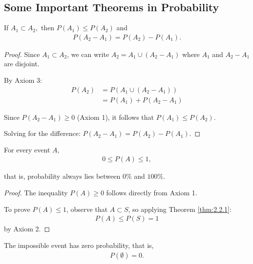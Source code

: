 \subsection{Some Important Theorems in Probability}

\begin{theorem}
	\label{thm:2.2.1}
	If $A_{1}\subset A_{2},$ then $P(A_{1})\leq P(A_{2})$ and
	\begin{align}
		P(A_{2}-A_{1})=P(A_{2})-P(A_{1}).
	\end{align}
\end{theorem}

\begin{proof}
	Since $A_1 \subset A_2$, we can write $A_2 = A_1 \cup (A_2 - A_1)$ where $A_1$ and $A_2 - A_1$ are disjoint.
	
	By Axiom 3:
	\begin{align}
		P(A_2) &= P(A_1 \cup (A_2 - A_1)) \\
		&= P(A_1) + P(A_2 - A_1)
	\end{align}
	
	Since $P(A_2 - A_1) \geq 0$ (Axiom 1), it follows that $P(A_1) \leq P(A_2)$.
	
	Solving for the difference: $P(A_2 - A_1) = P(A_2) - P(A_1)$.
\end{proof}


\begin{theorem}
	\label{thm:2.2.2}
	For every event $A$,
	\begin{align}
		\label{eq:2.2.5}
		0\leq P(A) \leq 1,
	\end{align}
	
	that is, probability always lies between $0\%$ and $100\%.$
\end{theorem}

\begin{proof}
	The inequality $P(A) \geq 0$ follows directly from Axiom 1.
	
	To prove $P(A) \leq 1$, observe that $A \subset S$, so applying Theorem \ref{thm:2.2.1}:
	\begin{align}
		P(A) \leq P(S) = 1
	\end{align}
	by Axiom 2.
\end{proof}


\begin{theorem}
	\label{thm:2.2.3}
	The impossible event has zero probability, that is,
	\begin{align}
		P(\emptyset)=0.
	\end{align}
\end{theorem}

